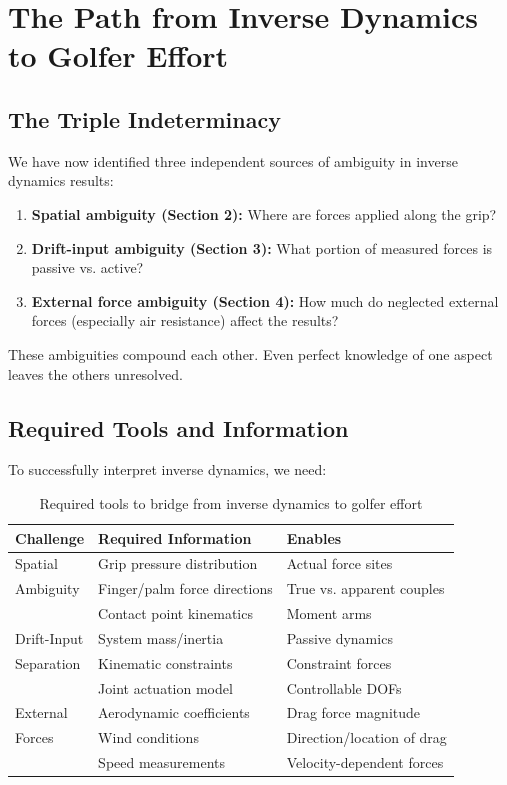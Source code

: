 \documentclass[11pt,a4paper]{article}
\theoremstyle{definition}
\theoremstyle{plain}
\begin{document}
\section{The Path from Inverse Dynamics to Golfer Effort}

\subsection{The Triple Indeterminacy}

We have now identified three independent sources of ambiguity in inverse dynamics results:

\begin{enumerate}
    \item \textbf{Spatial ambiguity (Section 2):} Where are forces applied along the grip?
    \item \textbf{Drift-input ambiguity (Section 3):} What portion of measured forces is passive vs. active?
    \item \textbf{External force ambiguity (Section 4):} How much do neglected external forces (especially air resistance) affect the results?
\end{enumerate}

These ambiguities compound each other. Even perfect knowledge of one aspect leaves the others unresolved.

\subsection{Required Tools and Information}

To successfully interpret inverse dynamics, we need:

\begin{table}[H]
\centering
\caption{Required tools to bridge from inverse dynamics to golfer effort}
\begin{tabular}{@{}lll@{}}
\toprule
\textbf{Challenge} & \textbf{Required Information} & \textbf{Enables} \\ \midrule
Spatial & Grip pressure distribution & Actual force sites \\
Ambiguity & Finger/palm force directions & True vs. apparent couples \\
 & Contact point kinematics & Moment arms \\ \midrule
Drift-Input & System mass/inertia & Passive dynamics \\
Separation & Kinematic constraints & Constraint forces \\
 & Joint actuation model & Controllable DOFs \\ \midrule
External & Aerodynamic coefficients & Drag force magnitude \\
Forces & Wind conditions & Direction/location of drag \\
 & Speed measurements & Velocity-dependent forces \\ \bottomrule
\end{tabular}
\label{tab:model_requirements}
\end{table}
\end{document}
